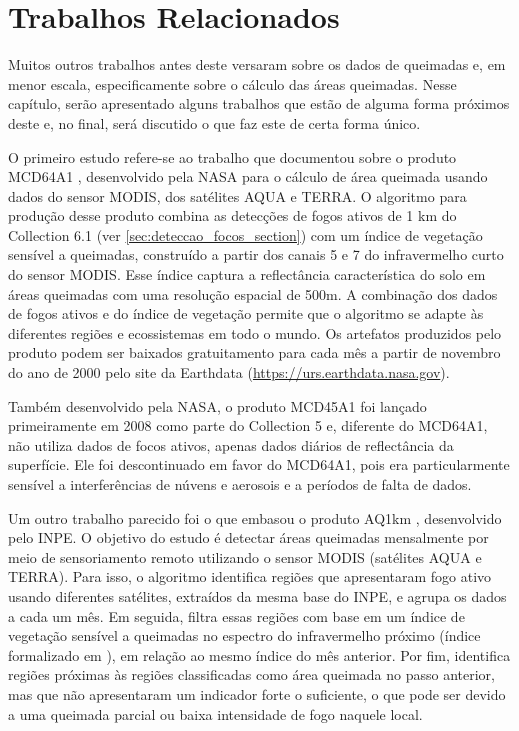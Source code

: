 \documentclass[cic,tc]{iiufrgs}
\begin{document}
\section{Trabalhos Relacionados}
\label{chp:trabalhos_relacionados}

Muitos outros trabalhos antes deste versaram sobre os dados de queimadas e, em menor escala, especificamente sobre o cálculo das áreas queimadas. Nesse capítulo, serão apresentado alguns trabalhos que estão de alguma forma próximos deste e, no final, será discutido o que faz este de certa forma único. \par

O primeiro estudo refere-se ao trabalho que documentou sobre o produto MCD64A1 \citep{GIGLIO201872}, desenvolvido pela NASA para o cálculo de área queimada usando dados do sensor MODIS, dos satélites AQUA e TERRA. O algoritmo para produção desse produto combina as detecções de fogos ativos de 1 km do Collection 6.1 (ver \ref{sec:deteccao_focos_section}) com um índice de vegetação sensível a queimadas, construído a partir dos canais 5 e 7 do infravermelho curto do sensor MODIS. Esse índice captura a reflectância característica do solo em áreas queimadas com uma resolução espacial de 500m. A combinação dos dados de fogos ativos e do índice de vegetação permite que o algoritmo se adapte às diferentes regiões e ecossistemas em todo o mundo. Os artefatos produzidos pelo produto podem ser baixados gratuitamento para cada mês a partir de novembro do ano de 2000 pelo site da Earthdata (\url{https://urs.earthdata.nasa.gov}).

Também desenvolvido pela NASA, o produto MCD45A1 foi lançado primeiramente em 2008 como parte do Collection 5 e, diferente do MCD64A1, não utiliza dados de focos ativos, apenas dados diários de reflectância da superfície. Ele foi descontinuado em favor do MCD64A1, pois era particularmente sensível a interferências de núvens e aerosois e a períodos de falta de dados. 

Um outro trabalho parecido foi o que embasou o produto AQ1km \citep{libonati2015algorithm}, desenvolvido pelo INPE. O objetivo do estudo é detectar áreas queimadas mensalmente por meio de sensoriamento remoto utilizando o sensor MODIS (satélites AQUA e TERRA). Para isso, o algoritmo identifica regiões que apresentaram fogo ativo usando diferentes satélites, extraídos da mesma base do INPE, e agrupa os dados a cada um mês. Em seguida, filtra essas regiões com base em um índice de vegetação sensível a queimadas no espectro do infravermelho próximo (índice formalizado em \citet{libonati2011}), em relação ao mesmo índice do mês anterior. Por fim, identifica regiões próximas às regiões classificadas como área queimada no passo anterior, mas que não apresentaram um indicador forte o suficiente, o que pode ser devido a uma queimada parcial ou baixa intensidade de fogo naquele local. \par
\end{document}
